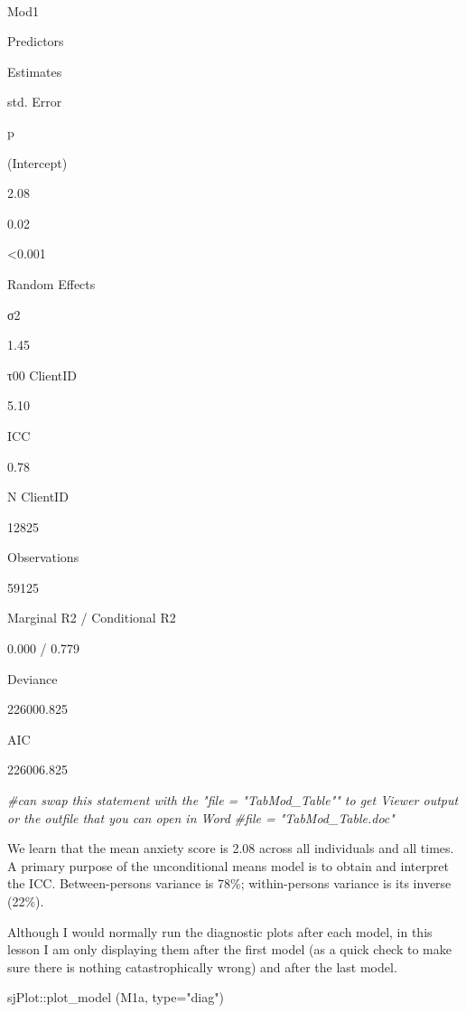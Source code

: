 \documentclass[
  11pt,
]{book}
\newenvironment{Shaded}{\begin{snugshade}}{\end{snugshade}}
\newcommand{\AttributeTok}[1]{\textcolor[rgb]{0.77,0.63,0.00}{#1}}
\newcommand{\CommentTok}[1]{\textcolor[rgb]{0.56,0.35,0.01}{\textit{#1}}}
\newcommand{\FunctionTok}[1]{\textcolor[rgb]{0.00,0.00,0.00}{#1}}
\newcommand{\NormalTok}[1]{#1}
\newcommand{\SpecialCharTok}[1]{\textcolor[rgb]{0.00,0.00,0.00}{#1}}
\newcommand{\StringTok}[1]{\textcolor[rgb]{0.31,0.60,0.02}{#1}}
\begin{document}
~

Mod1

Predictors

Estimates

std. Error

p

(Intercept)

2.08

0.02

\textless0.001

Random Effects

σ2

1.45

τ00 ClientID

5.10

ICC

0.78

N ClientID

12825

Observations

59125

Marginal R2 / Conditional R2

0.000 / 0.779

Deviance

226000.825

AIC

226006.825

\begin{Shaded}
\begin{Highlighting}[]
\CommentTok{\#can swap this statement with the "file = "TabMod\_Table"" to get Viewer output or the outfile that you can open in Word}
\CommentTok{\#file = "TabMod\_Table.doc"}
\end{Highlighting}
\end{Shaded}

We learn that the mean anxiety score is 2.08 across all individuals and all times. A primary purpose of the unconditional means model is to obtain and interpret the ICC. Between-persons variance is 78\%; within-persons variance is its inverse (22\%).

Although I would normally run the diagnostic plots after each model, in this lesson I am only displaying them after the first model (as a quick check to make sure there is nothing catastrophically wrong) and after the last model.

\begin{Shaded}
\begin{Highlighting}[]
\NormalTok{sjPlot}\SpecialCharTok{::}\FunctionTok{plot\_model}\NormalTok{ (M1a, }\AttributeTok{type=}\StringTok{"diag"}\NormalTok{)}
\end{Highlighting}
\end{Shaded}
\end{document}

